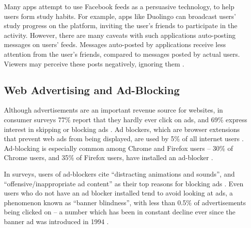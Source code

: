 \documentclass{sigchi}
\begin{document}
Many apps attempt to use Facebook feeds as a persuasive technology, to help users form study habits. For example, apps like Duolingo can broadcast users' study progress on the platform, inviting the user's friends to participate in the activity. However, there are many caveats with such applications auto-posting messages on users' feeds. Messages auto-posted by applications receive less attention from the user's friends, compared to messages posted by actual users. Viewers may perceive these posts negatively, ignoring them \cite{socialsharing}.

\pagebreak

\subsection{Web Advertising and Ad-Blocking}

Although advertisements are an important revenue source for websites, in consumer surveys 77\% report that they hardly ever click on ads, and 69\% express interest in skipping or blocking ads \cite{adblockinggames}. Ad blockers, which are browser extensions that prevent web ads from being displayed, are used by 5\% of all internet users \cite{adblockinggoesmainstream}. Ad-blocking is especially common among Chrome and Firefox users -- 30\% of Chrome users, and 35\% of Firefox users, have installed an ad-blocker \cite{adblockinggoesmainstream}.

In surveys, users of ad-blockers cite ``distracting animations and sounds'', and ``offensive/inappropriate ad content'' as their top reasons for blocking ads \cite{adblockinggames}. Even users who do not have an ad blocker installed tend to avoid looking at ads, a phenomenon known as ``banner blindness'', with less than 0.5\% of advertisements being clicked on -- a number which has been in constant decline ever since the banner ad was introduced in 1994 \cite{whypeopleavoidadvertising}.

\end{document}
